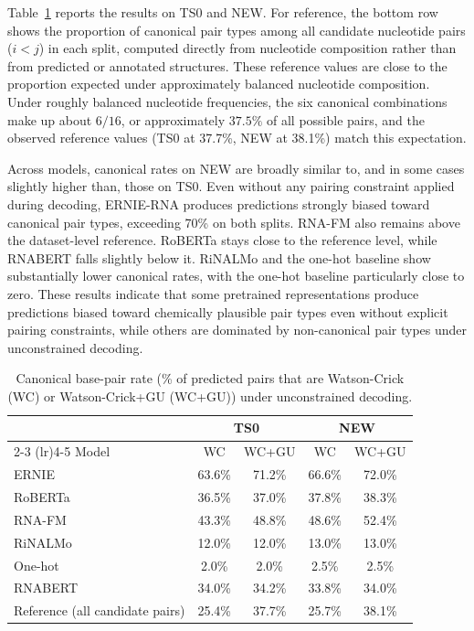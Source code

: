 \documentclass[logo,bsc,singlespacing,parskip]{infthesis}
\begin{document}
Table~\ref{tab:canonical_ts_new} reports the results on TS0 and NEW. For reference, the bottom row shows the proportion of canonical pair types among all candidate nucleotide pairs ($i<j$) in each split, computed directly from nucleotide composition rather than from predicted or annotated structures. These reference values are close to the proportion expected under approximately balanced nucleotide composition. Under roughly balanced nucleotide frequencies, the six canonical combinations make up about $6/16$, or approximately $37.5\%$ of all possible pairs, and the observed reference values (TS0 at 37.7\%, NEW at 38.1\%) match this expectation.

Across models, canonical rates on NEW are broadly similar to, and in some cases slightly higher than, those on TS0.
Even without any pairing constraint applied during decoding, ERNIE-RNA produces predictions strongly biased toward canonical pair types, exceeding 70\% on both splits. RNA-FM also remains above the dataset-level reference.
RoBERTa stays close to the reference level, while RNABERT falls slightly below it.
RiNALMo and the one-hot baseline show substantially lower canonical rates, with the one-hot baseline particularly close to zero.
These results indicate that some pretrained representations produce predictions biased toward chemically plausible pair types even without explicit pairing constraints, while others are dominated by non-canonical pair types under unconstrained decoding.

\begin{table}[t]
\centering
\caption{Canonical base-pair rate (\% of predicted pairs that are Watson-Crick (WC) or Watson-Crick+GU (WC+GU)) under unconstrained decoding.}
\label{tab:canonical_ts_new}
\begin{tabular}{lcccc}
\toprule
& \multicolumn{2}{c}{TS0} & \multicolumn{2}{c}{NEW} \\
\cmidrule(lr){2-3} \cmidrule(lr){4-5}
Model 
& WC & WC+GU 
& WC & WC+GU \\
\midrule
ERNIE   & 63.6\% & 71.2\% & 66.6\% & 72.0\% \\
RoBERTa & 36.5\% & 37.0\% & 37.8\% & 38.3\% \\
RNA-FM   & 43.3\% & 48.8\% & 48.6\% & 52.4\% \\
RiNALMo & 12.0\% & 12.0\% & 13.0\% & 13.0\% \\
One-hot & 2.0\% & 2.0\% & 2.5\% & 2.5\% \\
RNABERT & 34.0\% & 34.2\% & 33.8\% & 34.0\% \\
\midrule
Reference (all candidate pairs) & 25.4\% & 37.7\% & 25.7\% & 38.1\% \\
\bottomrule
\end{tabular}
\end{table}
\end{document}
